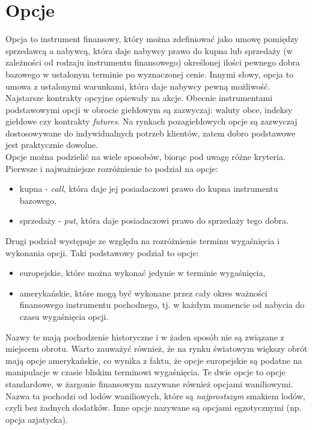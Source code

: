 \documentclass[]{pwr_wmat_praca_dyplomowa}
\theoremstyle{plain}
\numberwithin{theorem}{chapter}
\theoremstyle{definition}
\numberwithin{theorem}{chapter}
\begin{document}
\section{Opcje}
Opcja to instrument finansowy, który można zdefiniować jako umowę pomiędzy sprzedawcą a nabywcą, która daje nabywcy prawo do kupna lub sprzedaży (w zależności od rodzaju instrumentu finansowego) określonej ilości pewnego dobra bazowego w ustalonym terminie po wyznaczonej cenie. Innymi słowy, opcja to umowa z ustalonymi warunkami, która daje nabywcy pewną możliwość.
Najstarsze kontrakty opcyjne opiewały na akcje. Obecnie instrumentami podstawowymi opcji w obrocie giełdowym są zazwyczaj: waluty obce, indeksy giełdowe czy kontrakty \textit{futures}. Na rynkach pozagiełdowych opcje są zazwyczaj dostosowywane do indywidualnych potrzeb klientów, zatem dobro podstawowe jest praktycznie dowolne.\\

Opcje można podzielić na wiele sposobów, biorąc pod uwagę różne kryteria. Pierwsze i najważniejsze rozróżnienie to podział na opcje:
\begin{itemize}
\item kupna - \textit{call}, która daje jej posiadaczowi prawo do kupna instrumentu bazowego,
\item sprzedaży - \textit{put}, która daje posiadaczowi prawo do sprzedaży tego dobra.
\end{itemize}

\noindent Drugi podział występuje ze względu na rozróżnienie terminu wygaśnięcia i wykonania opcji. Taki podstawowy podział to opcje:
\begin{itemize}
\item europejskie, które można wykonać jedynie w terminie wygaśnięcia,
\item amerykańskie, które mogą być wykonane przez cały okres ważności finansowego instrumentu pochodnego, tj. w każdym momencie od nabycia do czasu wygaśnięcia opcji.
\end{itemize}
Nazwy te mają pochodzenie historyczne i w żaden sposób nie są związane z miejscem obrotu. Warto zauważyć również, że na rynku światowym większy obrót mają opcje amerykańskie, co wynika z faktu, że opcje europejskie są podatne na manipulacje w czasie bliskim terminowi wygaśnięcia. Te dwie opcje to opcje standardowe, w żargonie finansowym nazywane również opcjami waniliowymi. Nazwa ta pochodzi od lodów waniliowych, które są \textit{najprostszym} smakiem lodów, czyli bez żadnych dodatków. Inne opcje nazywane są opcjami egzotycznymi (np. opcja azjatycka).
\end{document}
